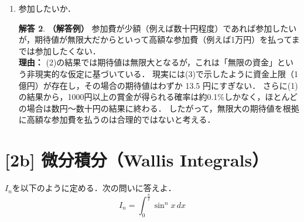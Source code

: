 \documentclass[dvipdfmx]{jlreq}
\theoremstyle{definition}
\newtheorem*{solution}{解答}
\begin{document}
\begin{enumerate}[label=(\arabic*)]
\begin{solution}
    また，このときの期待値 $E_{27}$ は，最大回数で表が出なかった場合は賞金0円であることに注意すると，
    \begin{align*}
        E_{27} &= \sum_{k=1}^{27} \left( 2^{k-1} \times \left(\frac{1}{2}\right)^k \right) \\
               &= \sum_{k=1}^{27} \frac{1}{2} \\
               &= 27 \times \frac{1}{2} = 13.5
    \end{align*}
    \textbf{答：最大回数 27 回，期待値 13.5 円}
    \end{solution}

    \item 参加したいか．
    \begin{solution}
    \textbf{（解答例）}
    参加費が少額（例えば数十円程度）であれば参加したいが，期待値が無限大だからといって高額な参加費（例えば1万円）を払ってまでは参加したくない．\\
    \textbf{理由：}
    (2)の結果では期待値は無限大となるが，これは「無限の資金」という非現実的な仮定に基づいている．
    現実には(3)で示したように資金上限（1億円）が存在し，その場合の期待値はわずか 13.5 円にすぎない．
    さらに(1)の結果から，1000円以上の賞金が得られる確率は約0.1\%しかなく，ほとんどの場合は数円〜数十円の結果に終わる．
    したがって，無限大の期待値を根拠に高額な参加費を払うのは合理的ではないと考える．
    \end{solution}
\end{enumerate}

\newpage

\section*{[2b] 微分積分（Wallis Integrals）}
$I_n$を以下のように定める．次の問いに答えよ．
\[I_n = \int_0^{\frac{\pi}{2}} \sin^n x \, dx\]
\end{document}
